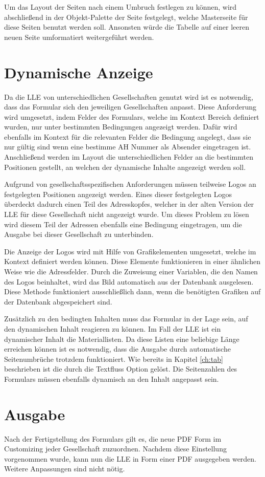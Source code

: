 Um das Layout der Seiten nach einem Umbruch festlegen zu können, wird abschließend in der Objekt-Palette der Seite festgelegt, welche Masterseite für diese Seiten benutzt werden soll. Ansonsten würde die Tabelle auf einer leeren neuen Seite umformatiert weitergeführt werden.

\FloatBarrier
\section{Dynamische Anzeige}
\label{ch:Dyn}

Da die \ac{LLE} von unterschiedlichen Gesellschaften genutzt wird ist es notwendig, dass das Formular sich den jeweiligen Gesellschaften anpasst. Diese Anforderung wird umgesetzt, indem Felder des Formulars, welche im Kontext Bereich definiert wurden, nur unter bestimmten Bedingungen angezeigt werden. Dafür wird ebenfalls im Kontext für die relevanten Felder die Bedingung angelegt, dass sie nur gültig sind wenn eine bestimme \ac{AH} Nummer als Absender eingetragen ist. Anschließend werden im Layout die unterschiedlichen Felder an die bestimmten Positionen gestellt, an welchen der dynamische Inhalte angezeigt werden soll. 

Aufgrund von gesellschaftsspezifischen Anforderungen müssen teilweise Logos an festgelegten Positionen angezeigt werden. Eines dieser festgelegten Logos überdeckt dadurch einen Teil des Adresskopfes, welcher in der alten Version der \ac{LLE} für diese Gesellschaft nicht angezeigt wurde. Um dieses Problem zu lösen wird diesem Teil der Adressen ebenfalls eine Bedingung eingetragen, um die Ausgabe bei dieser Gesellschaft zu unterbinden.  

Die Anzeige der Logos wird mit Hilfe von Grafikelementen umgesetzt, welche im Kontext definiert werden können. Diese Elemente funktionieren in einer ähnlichen Weise wie die Adressfelder. Durch die Zuweisung einer Variablen, die den Namen des Logos beinhaltet, wird das Bild automatisch aus der Datenbank ausgelesen. Diese Methode funktioniert ausschließlich dann, wenn die benötigten Grafiken auf der Datenbank abgespeichert sind.

Zusätzlich zu den bedingten Inhalten muss das Formular in der Lage sein, auf den dynamischen Inhalt reagieren zu können. Im Fall der \ac{LLE} ist ein dynamischer Inhalt die Materiallisten. Da diese Listen eine beliebige Länge erreichen können ist es notwendig, dass die Ausgabe durch automatische Seitenumbrüche trotzdem funktioniert. Wie bereits in Kapitel \ref{ch:tab} beschrieben ist die durch die Textfluss Option gelöst.
Die Seitenzahlen des Formulars müssen ebenfalls dynamisch an den Inhalt angepasst sein.

\FloatBarrier

\section{Ausgabe}

Nach der Fertigstellung des Formulars gilt es, die neue PDF Form im Customizing jeder Gesellschaft zuzuordnen. Nachdem diese Einstellung vorgenommen wurde, kann nun die \ac{LLE} in Form einer PDF ausgegeben werden. Weitere Anpassungen sind nicht nötig.


